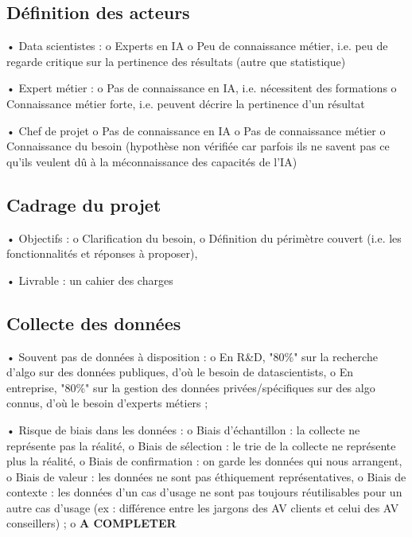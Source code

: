         \subsection{Définition des acteurs}

            •	Data scientistes :
                o	Experts en IA
                o	Peu de connaissance métier, i.e. peu de regarde critique sur la pertinence des résultats (autre que statistique)
            
            •	Expert métier :
                o	Pas de connaissance en IA, i.e. nécessitent des formations
                o	Connaissance métier forte, i.e. peuvent décrire la pertinence d’un résultat
            
            •	Chef de projet
                o	Pas de connaissance en IA
                o	Pas de connaissance métier
                o	Connaissance du besoin (hypothèse non vérifiée car parfois ils ne savent pas ce qu’ils veulent dû à la méconnaissance des capacités de l’IA)

        \subsection{Cadrage du projet}

            •	Objectifs :
                o	Clarification du besoin,
                o	Définition du périmètre couvert (i.e. les fonctionnalités et réponses à proposer),

            •   Livrable : un cahier des charges

        \subsection{Collecte des données}

            •	Souvent pas de données à disposition :
                o	En R\&D, "80\%" sur la recherche d’algo sur des données publiques, d'où le besoin de datascientists,
                o	En entreprise, "80\%" sur la gestion des données privées/spécifiques sur des algo connus, d'où le besoin d'experts métiers ;
    
            •	Risque de biais dans les données :
                o	Biais d’échantillon : la collecte ne représente pas la réalité,
                o	Biais de sélection : le trie de la collecte ne représente plus la réalité,
                o	Biais de confirmation : on garde les données qui nous arrangent,
                o	Biais de valeur : les données ne sont pas éthiquement représentatives,
                o	Biais de contexte : les données d’un cas d’usage ne sont pas toujours réutilisables pour un autre cas d’usage (ex : différence entre les jargons des AV clients et celui des AV conseillers) ;
                o	\textbf{A COMPLETER}
            
